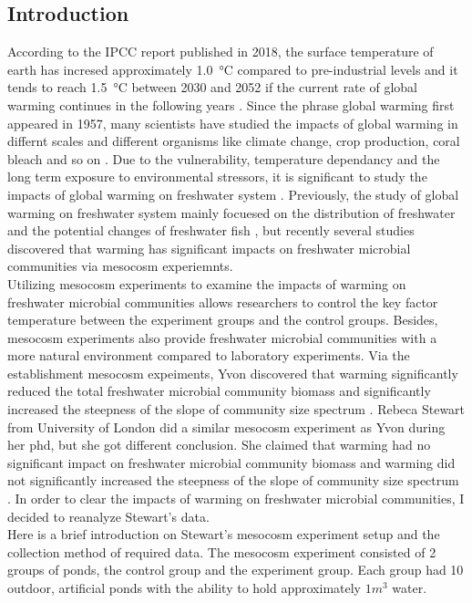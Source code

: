 \documentclass[11pt]{article}
\begin{document}
\begin{linenumbers}
\section*{Introduction}
According to the IPCC report published in 2018, the surface temperature of earth has incresed approximately \SI{1.0}{\celsius} compared to pre-industrial levels and it tends to reach \SI{1.5}{\celsius} between 2030 and 2052 if the current rate of global warming continues in the following years \cite{IPCC}.
Since the phrase global warming first appeared in 1957, many scientists have studied the impacts of global warming in differnt scales and different organisms like climate change, crop production, coral bleach and so on \cite{weart2009discovery}.
Due to the vulnerability, temperature dependancy and the long term exposure to environmental stressors, it is significant to study the impacts of global warming on freshwater system \cite{arnell1996effects}.
Previously, the study of global warming on freshwater system mainly focuesed on the distribution of freshwater and the potential changes of freshwater fish \cite{carpenter1992global},
but recently several studies discovered that warming has significant impacts on freshwater microbial communities via mesocosm experiemnts. \\
Utilizing mesocosm experiments to examine the impacts of warming on freshwater microbial communities allows researchers to control the key factor temperature between the experiment groups and the control groups.
Besides, mesocosm experiments also provide freshwater microbial communities with a more natural environment compared to laboratory experiments. Via the establishment mesocosm expeiments, Yvon discovered that warming significantly reduced the total freshwater microbial community biomass and significantly increased the steepness of the slope of community size spectrum \cite{yvon2011warming}.
Rebeca Stewart from University of London did a similar mesocosm experiment as Yvon during her phd, but she got different conclusion. She claimed that warming had no significant impact on freshwater microbial community biomass and warming did not significantly increased the steepness of the slope of community size spectrum \cite{rebecca}.
In order to clear the impacts of warming on freshwater microbial communities, I decided to reanalyze Stewart's data. \\
Here is a brief introduction on Stewart's mesocosm experiment setup and the collection method of required data.
The mesocosm experiment consisted of 2 groups of ponds, the control group and the experiment group. Each group had 10 outdoor, artificial ponds with the ability to hold approximately \( 1 m^3\) water.

\end{linenumbers}
\end{document}
